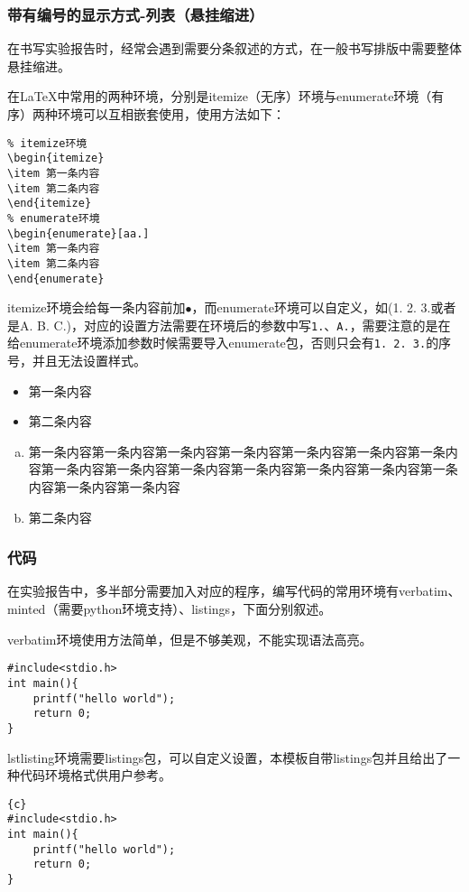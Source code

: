 \subsubsection{带有编号的显示方式-列表（悬挂缩进）}
在书写实验报告时，经常会遇到需要分条叙述的方式，在一般书写排版中需要整体悬挂缩进。

在\LaTeX 中常用的两种环境，分别是itemize（无序）环境与enumerate环境（有序）两种环境可以互相嵌套使用，使用方法如下：
\begin{verbatim}
% itemize环境
\begin{itemize}
\item 第一条内容
\item 第二条内容
\end{itemize}
% enumerate环境
\begin{enumerate}[aa.]
\item 第一条内容
\item 第二条内容
\end{enumerate}
\end{verbatim}
itemize环境会给每一条内容前加$\bullet$，而enumerate环境可以自定义，如(1. 2. 3.或者是A. B. C.)，对应的设置方法需要在环境后的参数中写\verb|1.|、\verb|A.|，需要注意的是在给enumerate环境添加参数时候需要导入enumerate包，否则只会有\verb|1. 2. 3.|的序号，并且无法设置样式。
\begin{itemize}
\item 第一条内容
\item 第二条内容
\end{itemize}
\begin{enumerate}[a.]
\item 第一条内容第一条内容第一条内容第一条内容第一条内容第一条内容第一条内容第一条内容第一条内容第一条内容第一条内容第一条内容第一条内容第一条内容第一条内容第一条内容
\item 第二条内容
\end{enumerate}
\subsubsection{代码}
在实验报告中，多半部分需要加入对应的程序，编写代码的常用环境有verbatim、minted（需要python环境支持）、listings，下面分别叙述。

verbatim环境使用方法简单，但是不够美观，不能实现语法高亮。
\begin{verbatim}
#include<stdio.h>
int main(){
	printf("hello world");
	return 0;
}
\end{verbatim}

lstlisting环境需要listings包，可以自定义设置，本模板自带listings包并且给出了一种代码环境格式供用户参考。
\begin{lstlisting}{c}
#include<stdio.h>
int main(){
	printf("hello world");
	return 0;
}
\end{lstlisting}

